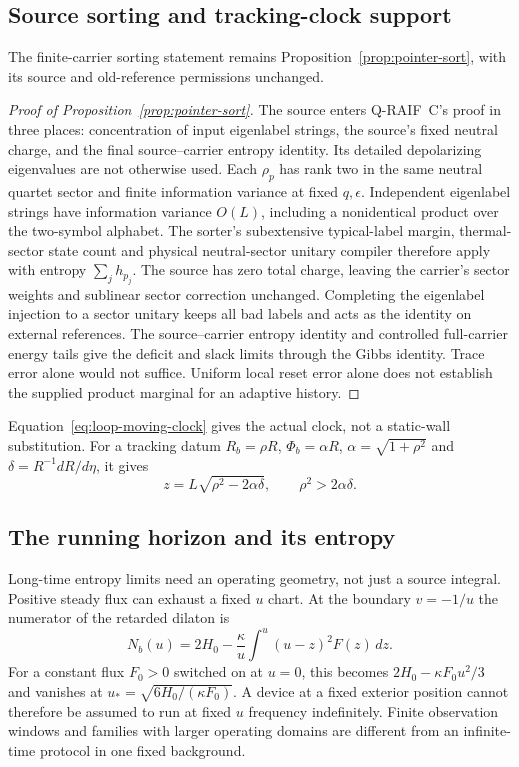 \subsection{Source sorting and tracking-clock support}
\label{app:source-clock-support}

The finite-carrier sorting statement remains
Proposition~\ref{prop:pointer-sort}, with its source and old-reference
permissions unchanged.
\begin{proof}[Proof of Proposition~\ref{prop:pointer-sort}]
The source enters Q-RAIF~C's proof in three places: concentration
of input eigenlabel strings, the source's fixed neutral charge, and the
final source--carrier entropy identity. Its detailed depolarizing
eigenvalues are not otherwise used. Each $\rho_p$ has rank two in the
same neutral quartet sector and finite information variance at fixed
$q,\epsilon$. Independent eigenlabel
strings have information variance $O(L)$, including a nonidentical
product over the two-symbol alphabet. The sorter's subextensive
typical-label margin, thermal-sector state count and physical
neutral-sector unitary compiler therefore apply with entropy
$\sum_jh_{p_j}$. The source has zero total charge, leaving the carrier's
sector weights and sublinear sector correction unchanged. Completing
the eigenlabel injection to a sector unitary keeps all bad labels and
acts as the identity on external references. The source--carrier entropy
identity and controlled full-carrier energy tails give the deficit and
slack limits through the Gibbs identity. Trace error alone would not
suffice. Uniform local reset error alone does not establish the supplied
product marginal for an adaptive history.
\end{proof}

Equation~\eqref{eq:loop-moving-clock} gives the actual clock, not
a static-wall substitution. For a tracking datum $R_b=\rho R$,
$\Phi_b=\alpha R$, $\alpha=\sqrt{1+\rho^2}$ and
$\delta=R^{-1}dR/d\eta$, it gives
\begin{equation}\label{eq:tracking-clock-exact}
 z=L\sqrt{\rho^2-2\alpha\delta},\qquad \rho^2>2\alpha\delta.
\end{equation}

\subsection{The running horizon and its entropy}
\label{sec:running-horizon}

Long-time entropy limits need an operating geometry, not just a source integral.
Positive steady flux can exhaust a fixed $u$ chart. At the boundary $v=-1/u$
the numerator of the retarded dilaton is
\[
 N_b(u)=2H_0-\frac{\kappa}{u}\int^u(u-z)^2F(z)\,dz.
\]
For a constant flux $F_0>0$ switched on at $u=0$, this becomes
$2H_0-\kappa F_0u^2/3$ and vanishes at
$u_*=\sqrt{6H_0/(\kappa F_0)}$. A device at a fixed exterior position cannot
therefore be assumed to run at fixed $u$ frequency indefinitely. Finite
observation windows and families with larger operating domains are different
from an infinite-time protocol in one fixed background.

